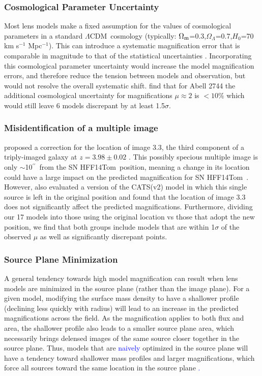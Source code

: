 \documentclass[iop]{emulateapj}
\newcommand{\change}[1]{{ \textcolor{blue}{#1}}}
\newcommand{\change}[1]{#1}
\def\tomas{HFF14Tom}
\def\Om{\ensuremath{\Omega_{\rm m}}}
\def\OL{\ensuremath{\Omega_{\Lambda}}}
\def\LCDM{$\Lambda$CDM}
\def\Ho{\ensuremath{H_0}}
\def\arcsec{\ensuremath{^{\prime\prime}}}
\begin{document}
\subsubsection{Cosmological Parameter Uncertainty}
Most lens models make a
fixed assumption for the values of cosmological parameters in a
standard \LCDM\ cosmology (typically: \Om=0.3,\OL=0.7,\Ho=70 km
s$^{-1}$ Mpc$^{-1}$). This can introduce a systematic magnification
error that is comparable in magnitude to that of the statistical
uncertainties \citep{Zitrin:2014b,Bayliss:2015}.  
Incorporating this
cosmological parameter uncertainty would increase the model magnification 
errors, and therefore reduce the tension between models and observation, but would not
resolve the overall systematic shift.  \citet{Bayliss:2015} find that for Abell 2744 the additional cosmological uncertainty for magnifications $\mu\approx2$ is $<10\%$ which would still leave 6 models discrepant by at least 1.5$\sigma$. 


\subsubsection{Misidentification of a multiple image}
\citet{Jauzac:2015b} proposed a correction
for the location of image 3.3, the third component of a triply-imaged
galaxy \citep{Merten:2011} at $z=3.98\pm0.02$ \citep{Johnson:2014}.
This possibly specious multiple image is only $\sim$10\arcsec\ from
the SN \tomas\ position, meaning a change in its location could have a
large impact on the predicted magnification for
SN \tomas\ \citep[see][for a quantitative discussion of this
effect]{Johnson:2014}.  However, \citet{Jauzac:2015b} also evaluated a
version of the CATS(v2) model in which this single source is left in
the original position and found that the location of image 3.3 does
not significantly affect the predicted magnifications.  Furthermore,
dividing our 17 models into those using the original location vs those
that adopt the new position, we find that both groups include models
that are within 1$\sigma$ of the observed $\mu$ as well as
significantly discrepant points.

\subsubsection{Source Plane Minimization}
\label{sec:SourcePlaneMinimization}

A general tendency towards high model magnification can result when
lens models are minimized in the source plane (rather than the image
plane).  For a given model, modifying the surface mass density to have
a shallower profile (declining less quickly with radius) will lead to
an increase in the predicted magnifications across the field.  As the
magnification applies to both flux and area, the shallower profile
also leads to a smaller source plane area, which necessarily brings
delensed images of the same source closer together in the source
plane.  Thus, models that are \change{naively} optimized in the source
plane will have a tendency toward shallower mass profiles and larger
magnifications, which force all sources toward the same location in
the source plane 
\change{\citep[see, e.g.,][]{Kochanek:1991a,Kochanek:2006,Jee:2007,Ponente:2011}.}
\end{document}
